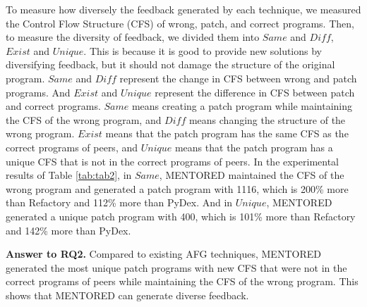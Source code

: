 \documentclass[10pt,conference]{IEEEtran}
\begin{document}
        To measure how diversely the feedback generated by each technique, we measured the Control Flow Structure (CFS) of wrong, patch, and correct programs. Then, to measure the diversity of feedback, we divided them into $Same$ and $Diff$, $Exist$ and $Unique$. This is because it is good to provide new solutions by diversifying feedback, but it should not damage the structure of the original program. $Same$ and $Diff$ represent the change in CFS between wrong and patch programs. And $Exist$ and $Unique$ represent the difference in CFS between patch and correct programs. $Same$ means creating a patch program while maintaining the CFS of the wrong program, and $Diff$ means changing the structure of the wrong program. $Exist$ means that the patch program has the same CFS as the correct programs of peers, and $Unique$ means that the patch program has a unique CFS that is not in the correct programs of peers. In the experimental results of Table \ref{tab:tab2}, in $Same$, MENTORED maintained the CFS of the wrong program and generated a patch program with 1116, which is 200\% more than Refactory and 112\% more than PyDex. And in $Unique$, MENTORED generated a unique patch program with 400, which is 101\% more than Refactory and 142\% more than PyDex.

        \begin{tcolorbox}
            \textbf{Answer to RQ2.}
            Compared to existing AFG techniques, MENTORED generated the most unique patch programs with new CFS that were not in the correct programs of peers while maintaining the CFS of the wrong program. This shows that MENTORED can generate diverse feedback.
        \end{tcolorbox}
\end{document}
